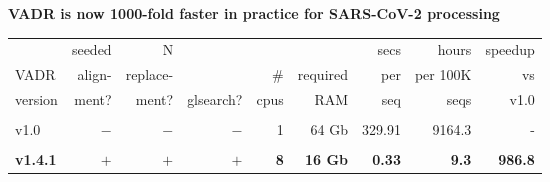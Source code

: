 \documentclass[landscape]{slides}
\begin{document}
\begin{slide}
\begin{center}
\normalsize{\textbf{VADR is now 1000-fold faster in practice for SARS-CoV-2 processing}}

\scriptsize
\begin{tabular}{lrrrrrrrr}
            &seeded      &N           &            &            &            &secs        &hours       &speedup     \\ 
VADR        &align-      &replace-    &            &\#          &required    &per         &per 100K    &vs          \\ 
version     &ment?       &ment?       &glsearch?   &cpus        &RAM         &seq         &seqs        &v1.0        \\ 
\hline
& & & & & & & & \\
v1.0         &$-$         &$-$         &$-$         &1           &64 Gb       &329.91      &9164.3      &-           \\
& & & & & & & & \\
\textbf{v1.4.1}&\textbf{$+$}&\textbf{$+$}&\textbf{$+$}&\textbf{8}  &\textbf{16 Gb}&\textbf{0.33}&\textbf{9.3}&\textbf{986.8}\\
\end{tabular}
\end{center}

\vfill
\end{slide}
\end{document}
